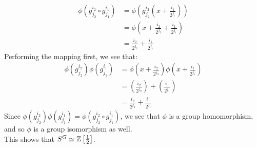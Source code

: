 \begin{align*}
\phi\left(g_{j_2}^{i_2} \circ g_{j_1}^{i_1}\right)
&=\phi \left(g_{j_2}^{i_2}\left(x+\frac{i_{1}}{2^{j_1}}\right)\right) \\
&=\phi\left(x+\frac{i_{2}}{2^{j_2}}+\frac{i_{1}}{2^{j_1}}\right) \\
&=\frac{i_{2}}{2^{j_2}}+\frac{i_{1}}{2^{j_1}}
\end{align*}
Performing the mapping first, we see that:
\begin{align*}
\phi\left(g_{j_2}^{i_2}\right)\phi\left(g_{j_1}^{i_1}\right)
&=\phi \left(x+\frac{i_{2}}{2^{j_2}}\right)\phi \left(x+\frac{i_{1}}{2^{j_1}}\right) \\
&=\left(\frac{i_{2}}{2^{j_2}}\right) + \left(\frac{i_{1}}{2^{j_1}}\right) \\
&=\frac{i_{2}}{2^{j_2}}+\frac{i_{1}}{2^{j_1}}
\end{align*}
Since $\phi\left(g_{j_2}^{i_2}\right)\phi\left(g_{j_1}^{i_1}\right)=\phi\left(g_{j_2}^{i_2} \circ g_{j_1}^{i_1}\right)$, we see that $\phi$ is a group homomorphism, and so $\phi$ is a group isomorphism as well. \\

This shows that $S^G\simeq \mathbb{Z}\left[\frac{1}{2}\right]$.


